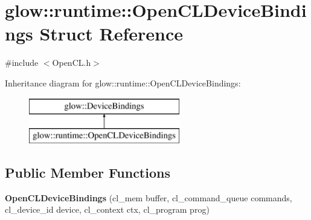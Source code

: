 \hypertarget{structglow_1_1runtime_1_1_open_c_l_device_bindings}{}\section{glow\+:\+:runtime\+:\+:Open\+C\+L\+Device\+Bindings Struct Reference}
\label{structglow_1_1runtime_1_1_open_c_l_device_bindings}


{\ttfamily \#include $<$Open\+C\+L.\+h$>$}

Inheritance diagram for glow\+:\+:runtime\+:\+:Open\+C\+L\+Device\+Bindings\+:\begin{figure}[H]
\begin{center}
\leavevmode
\includegraphics[height=2.000000cm]{structglow_1_1runtime_1_1_open_c_l_device_bindings}
\end{center}
\end{figure}
\subsection*{Public Member Functions}
\begin{DoxyCompactItemize}
\item 
\mbox{\label{structglow_1_1runtime_1_1_open_c_l_device_bindings_a69d69f77749e11f252c297a896a93886}} 
{\bfseries Open\+C\+L\+Device\+Bindings} (cl\+\_\+mem buffer, cl\+\_\+command\+\_\+queue commands, cl\+\_\+device\+\_\+id device, cl\+\_\+context ctx, cl\+\_\+program prog)
\end{DoxyCompactItemize}
